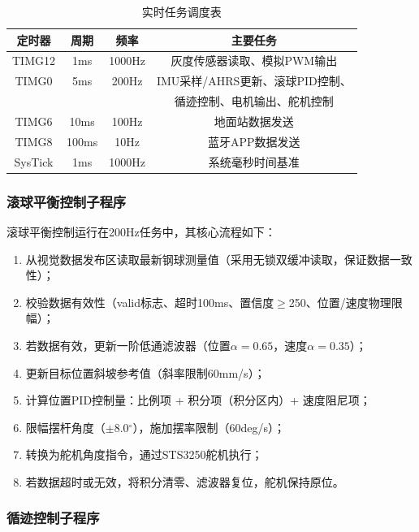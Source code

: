 \documentclass[12pt,a4paper]{ctexart}
\begin{document}
\begin{table}[H]
    \centering
    \footnotesize
    \caption{实时任务调度表}
    \label{tab:task_schedule}
    \begin{tabular}{|c|c|c|c|}
        \hline
        定时器 & 周期 & 频率 & 主要任务 \\
        \hline
        TIMG12 & 1ms & 1000Hz & 灰度传感器读取、模拟PWM输出 \\
        \hline
        TIMG0 & 5ms & 200Hz & IMU采样/AHRS更新、滚球PID控制、\\& & & 循迹控制、电机输出、舵机控制 \\
        \hline
        TIMG6 & 10ms & 100Hz & 地面站数据发送 \\
        \hline
        TIMG8 & 100ms & 10Hz & 蓝牙APP数据发送 \\
        \hline
        SysTick & 1ms & 1000Hz & 系统毫秒时间基准 \\
        \hline
    \end{tabular}
\end{table}

\subsubsection{滚球平衡控制子程序}

滚球平衡控制运行在200Hz任务中，其核心流程如下：

\begin{enumerate}
    \item 从视觉数据发布区读取最新钢球测量值（采用无锁双缓冲读取，保证数据一致性）；
    \item 校验数据有效性（valid标志、超时100ms、置信度$\geq$250、位置/速度物理限幅）；
    \item 若数据有效，更新一阶低通滤波器（位置$\alpha=0.65$，速度$\alpha=0.35$）；
    \item 更新目标位置斜坡参考值（斜率限制60mm/s）；
    \item 计算位置PID控制量：比例项 + 积分项（积分区内）+ 速度阻尼项；
    \item 限幅摆杆角度（$\pm$8.0$^\circ$），施加摆率限制（60deg/s）；
    \item 转换为舵机角度指令，通过STS3250舵机执行；
    \item 若数据超时或无效，将积分清零、滤波器复位，舵机保持原位。
\end{enumerate}

\subsubsection{循迹控制子程序}
\end{document}
